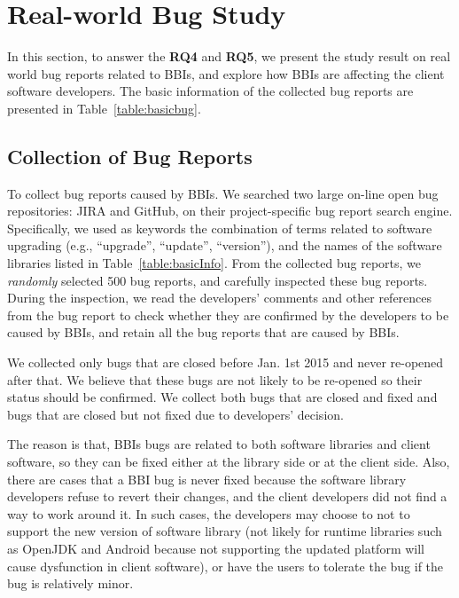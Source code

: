 
\section{Real-world Bug Study}
\label{sec:studybug}
In this section, to answer the \textbf{RQ4} and \textbf{RQ5}, we present the study result on real world bug reports related to BBIs, and explore how BBIs are affecting the client software developers. The basic information of the collected bug reports are presented in Table~\ref{table:basicbug}. 


\subsection{Collection of Bug Reports}
To collect bug reports caused by BBIs. We searched two large on-line open bug repositories: JIRA and GitHub, on their project-specific bug report search engine. Specifically, we used as keywords the combination of terms related to software upgrading (e.g., ``upgrade'', ``update'', ``version''), and the names of the software libraries listed in Table~\ref{table:basicInfo}. From the collected bug reports, we \textit{randomly} selected 500 bug reports, and carefully inspected these bug reports. During the inspection, we read the developers' comments and other references from the bug report to check whether they are confirmed by the developers to be caused by BBIs, and retain all the bug reports that are caused by BBIs. 

We collected only bugs that are closed before Jan. 1st 2015 and never re-opened after that. We believe that these bugs are not likely to be re-opened so their status should be confirmed. We collect both bugs that are closed and fixed and bugs that are closed but not fixed due to developers' decision. 

The reason is that, BBIs bugs are related to both software libraries and client software, so they can be fixed either at the library side or at the client side. Also, there are cases that a BBI bug is never fixed because the software library developers refuse to revert their changes, and the client developers did not find a way to work around it. In such cases, the developers may choose to not to support the new version of software library (not likely for runtime libraries such as OpenJDK and Android because not supporting the updated platform will cause dysfunction in client software), or have the users to tolerate the bug if the bug is relatively minor. 

